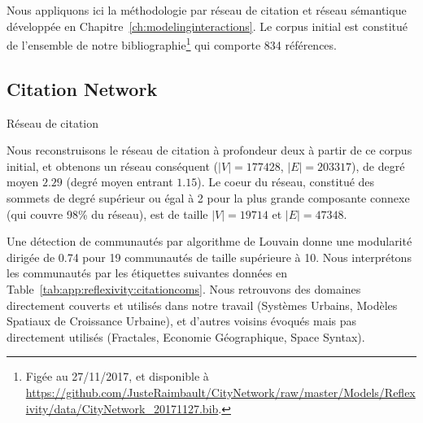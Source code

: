 Nous appliquons ici la méthodologie par réseau de citation et réseau sémantique développée en Chapitre~\ref{ch:modelinginteractions}. Le corpus initial est constitué de l'ensemble de notre bibliographie\footnote{Figée au 27/11/2017, et disponible à \url{https://github.com/JusteRaimbault/CityNetwork/raw/master/Models/Reflexivity/data/CityNetwork_20171127.bib}.} qui comporte 834 références.


\subsection{Citation Network}{Réseau de citation}

Nous reconstruisons le réseau de citation à profondeur deux à partir de ce corpus initial, et obtenons un réseau conséquent ($\left|V\right| = 177428$, $\left|E\right| = 203317$), de degré moyen $2.29$ (degré moyen entrant $1.15$). Le coeur du réseau, constitué des sommets de degré supérieur ou égal à 2 pour la plus grande composante connexe (qui couvre 98\% du réseau), est de taille $\left|V\right| = 19714$ et $\left|E\right| = 47348$.





Une détection de communautés par algorithme de Louvain donne une modularité dirigée de 0.74 pour 19 communautés de taille supérieure à 10. Nous interprétons les communautés par les étiquettes suivantes données en Table~\ref{tab:app:reflexivity:citationcoms}. Nous retrouvons des domaines directement couverts et utilisés dans notre travail (Systèmes Urbains, Modèles Spatiaux de Croissance Urbaine), et d'autres voisins évoqués mais pas directement utilisés (Fractales, Economie Géographique, Space Syntax).




